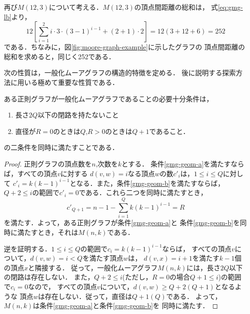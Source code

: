 \begin{example}
  再び$M(12,3)$について考える．$M(12,3)$の頂点間距離の総和は，
  式\ref{eq:gmg-lb}より，
  \[ 12\left[\sum_{i=1}^2i\cdot3\cdot(3-1)^{i-1}+(2+1)\cdot2\right]=
  12(3+12+6)=252\]
  である．ちなみに，図\ref{fig:moore-graph-example}に示したグラフの
  頂点間距離の総和を求めると，同じく252である．
\end{example}

次の性質は，一般化ムーアグラフの構造的特徴を定める．
後に説明する探索方法に用いる極めて重要な性質である．
\begin{theorem}
  \label{thm:gmg-geometric-property}
  ある正則グラフが一般化ムーアグラフであることの必要十分条件は，
  \begin{enumerate}[a]
  \item 長さ$2Q$以下の閉路を持たないこと
    \label{gmg-geom-a}
  \item 直径が$R=0$のときは$Q$,\hspace{1ex}$R>0$のときは$Q+1$であること．
    \label{gmg-geom-b}
  \end{enumerate}
  の二条件を同時に満たすことである．
\end{theorem}
\begin{proof}
  正則グラフの頂点数を$n$,次数を$k$とする．
  条件\ref{gmg-geom-a}を満たすならば，すべての頂点$v$に対する
  $d(v,w)=i$なる頂点$w$の数$c'_i$は，$1\leq i\leq Q$に対して
  $c'_i=k(k-1)^{i-1}$となる．また，条件\ref{gmg-geom-b}を満たすならば，
  $Q+2\leq i$の範囲で$c'_i=0$である．これら二つを同時に満たすとき，
  \[ c'_{Q+1}=n-1-\sum_{i=1}^{Q}k(k-1)^{i-1}=R \]
  を満たす．よって，ある正則グラフが条件\ref{gmg-geom-a}と
  条件\ref{gmg-geom-b}を同時に満たすとき，それは$M(n,k)$である．

  逆を証明する．$1\leq i\leq Q$の範囲で$c_i=k(k-1)^{i-1}$ならば，
  すべての頂点$v$について，$d(v,w)=i<Q$を満たす頂点$w$は，
  $d(v,x)=i+1$を満たす$k-1$個の頂点$x$と隣接する．
  従って，一般化ムーアグラフ$M(n,k)$には，長さ$2Q$以下の閉路は存在しない．
  また，$Q+2\leq i$(ただし，$R=0$の場合$Q+1\leq i$)の範囲で$c_i=0$なので，
  すべての頂点$v$について，$d(v,w)\geq Q+2$\hspace{.3ex}$(Q+1)$となるような
  頂点$w$は存在しない．従って，直径は$Q+1$\hspace{.3ex}$(Q)$である．
  よって，$M(n,k)$は条件\ref{gmg-geom-a}と条件\ref{gmg-geom-b}を
  同時に満たす．
\end{proof}
